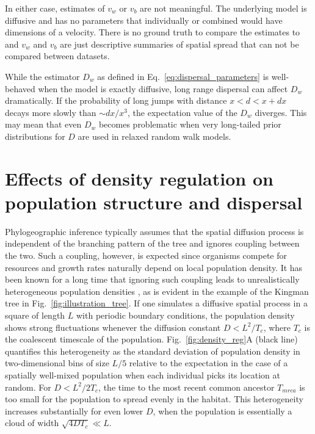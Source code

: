 \documentclass[aps,rmp, twocolumn]{revtex4}
\begin{document}
In either case, estimates of $v_w$ or $v_b$ are not meaningful.
The underlying model is diffusive and has no parameters that individually or combined would have dimensions of a velocity.
There is no ground truth to compare the estimates to and $v_w$ and $v_b$ are just descriptive summaries of spatial spread that can not be compared between datasets.

While the estimator $D_w$ as defined in Eq.~\ref{eq:dispersal_parameters} is well-behaved when the model is exactly diffusive, long range dispersal can affect $D_w$ dramatically.
If the probability of long jumps with distance $x<d<x+dx$ decays more slowly than $\sim dx/x^3$, the expectation value of the $D_w$ diverges.
This may mean that even $D_w$ becomes problematic when very long-tailed prior distributions for $D$ are used in relaxed random walk models.


\section*{Effects of density regulation on population structure and dispersal}
Phylogeographic inference typically assumes that the spatial diffusion process is independent of the branching pattern of the tree and ignores coupling between the two.
Such a coupling, however, is expected since organisms compete for resources and growth rates naturally depend on local population density.
It has been known for a long time that ignoring such coupling leads to unrealistically heterogeneous population densities \citep{felsenstein_pain_1975}, as is evident in the example of the Kingman tree in Fig.~\ref{fig:illustration_tree}.
If one simulates a diffusive spatial process in a square of length $L$ with periodic boundary conditions, the population density shows strong fluctuations whenever the diffusion constant $D<L^2/T_c$, where $T_c$ is the coalescent timescale of the population.
Fig.~\ref{fig:density_reg}A (black line) quantifies this heterogeneity as the standard deviation of population density in two-dimensional bins of size $L/5$ relative to the expectation in the case of a spatially well-mixed population when each individual picks its location at random.
For $D<L^2/2T_c$, the time to the most recent common ancestor $T_{mrca}$ is too small for the population to spread evenly in the habitat.
This heterogeneity increases substantially for even lower $D$, when the population is essentially a cloud of width $\sqrt{4DT_c}\ll L$.
\end{document}
